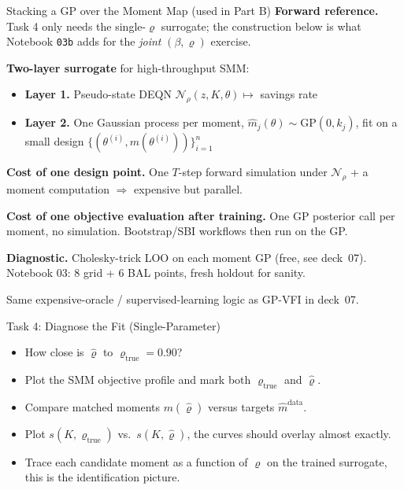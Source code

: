 \documentclass[10pt,aspectratio=169]{beamer}
\begin{document}
\begin{frame}{Stacking a GP over the Moment Map (used in Part B)}
\textbf{Forward reference.} Task 4 only needs the single-$\varrho$ surrogate; the construction below is what Notebook \texttt{03b} adds for the \emph{joint} $(\beta,\varrho)$ exercise.

\medskip
\textbf{Two-layer surrogate} for high-throughput SMM:

\smallskip
\begin{itemize}\itemsep0pt
  \item \textbf{Layer 1.} Pseudo-state DEQN $\mathcal{N}_\rho(z, K, \theta) \mapsto $ savings rate
  \item \textbf{Layer 2.} One Gaussian process per moment, $\widehat m_j(\theta) \sim \mathrm{GP}(0, k_j)$, fit on a small design $\{(\theta^{(i)}, m(\theta^{(i)}))\}_{i=1}^n$
\end{itemize}

\smallskip
\textbf{Cost of one design point.} One $T$-step forward simulation under $\mathcal{N}_\rho$ + a moment computation $\Rightarrow$ expensive but parallel.

\smallskip
\textbf{Cost of one objective evaluation after training.} One GP posterior call per moment, no simulation. Bootstrap/SBI workflows then run on the GP.

\smallskip
\textbf{Diagnostic.} Cholesky-trick LOO on each moment GP (free, see deck~07). Notebook 03: 8 grid + 6 BAL points, fresh holdout for sanity.

\medskip
{\scriptsize Same expensive-oracle / supervised-learning logic as GP-VFI in deck~07.}
\end{frame}

\begin{frame}{Task 4: Diagnose the Fit (Single-Parameter)}
\begin{itemize}
  \item How close is $\hat\varrho$ to $\varrho_{\text{true}} = 0.90$?
  \item Plot the SMM objective profile and mark both $\varrho_{\text{true}}$ and $\hat\varrho$.
  \item Compare matched moments $m(\hat\varrho)$ versus targets $\hat{m}^{\mathrm{data}}$.
  \item Plot $s(K, \varrho_{\text{true}})$ vs.\ $s(K, \hat\varrho)$, the curves should overlay almost exactly.
  \item Trace each candidate moment as a function of $\varrho$ on the trained surrogate, this is the identification picture.
\end{itemize}
\end{frame}
\end{document}
